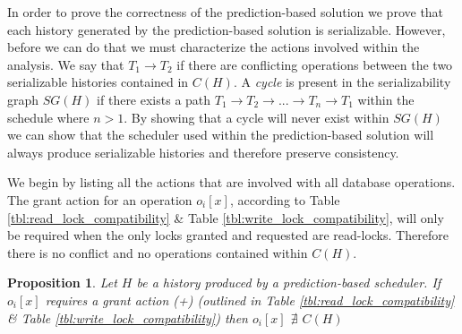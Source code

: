 \documentclass[conference]{IEEEtran}
\newtheorem{proposition}{Proposition}
\begin{document}
In order to prove the correctness of the prediction-based solution we prove that each history generated by the prediction-based solution is serializable. However, before we can do that we must characterize the actions involved within the analysis. We say that $T_{1} \rightarrow T_{2}$ if there are conflicting operations between the two serializable histories contained in $C(H)$. A \textit{cycle} is present in the serializability graph $SG(H)$ if there exists a path $T_{1} \rightarrow T_{2} \rightarrow ... \rightarrow T_{n} \rightarrow T_{1}$ within the schedule where $n > 1$. By showing that a cycle will never exist within $SG(H)$ we can show that the scheduler used within the prediction-based solution will always produce serializable histories and therefore preserve consistency.

We begin by listing all the actions that are involved with all database operations. The grant action for an operation $o_{i}[x]$, according to Table \ref{tbl:read_lock_compatibility} \& Table \ref{tbl:write_lock_compatibility}, will only be required when the only locks granted and requested are read-locks. Therefore there is no conflict and no operations contained within $C(H)$.

\begin{proposition}
\label{prop:grant}
Let $H$ be a history produced by a prediction-based scheduler. If $o_{i}[x]$ requires a grant action (+) (outlined in Table \ref{tbl:read_lock_compatibility} \& Table \ref{tbl:write_lock_compatibility}) then $o_{i}[x]$ $\nexists$ $C(H)$
\end{proposition}


\end{document}

